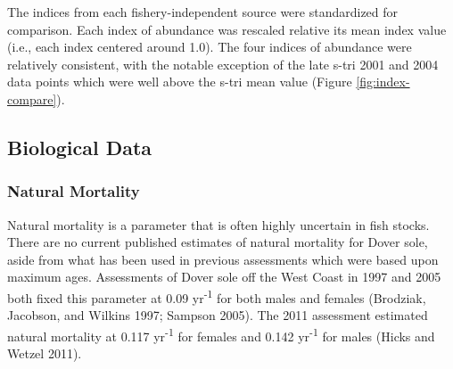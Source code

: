 \documentclass[11pt,
  english,
  a4paper,
]{article}
\begin{document}
\leavevmode\tagmcend\tagstructend


The indices from each fishery-independent source were standardized for comparison. Each index of abundance was rescaled relative its mean index value (i.e., each index centered around 1.0). The four indices of abundance were relatively consistent, with the notable exception of the late \gls{s-tri} 2001 and 2004 data points which were well above the \gls{s-tri} mean value (Figure \ref{fig:index-compare}).

\leavevmode\tagmcend\tagstructend\par


\hypertarget{biological-data}{%
\subsection{Biological Data}\label{biological-data}}

\leavevmode\tagmcend\tagstructend


\hypertarget{natural-mortality}{%
\subsubsection{Natural Mortality}\label{natural-mortality}}

\leavevmode\tagmcend\tagstructend


Natural mortality is a parameter that is often highly uncertain in fish stocks. There are no current published estimates of natural mortality for Dover sole, aside from what has been used in previous assessments which were based upon maximum ages. Assessments of Dover sole off the West Coast in 1997 and 2005 both fixed this parameter at 0.09 yr\textsuperscript{-1} for both males and females {(Brodziak, Jacobson, and Wilkins 1997; Sampson 2005)\leavevmode\tagmcend\tagstructend}. The 2011 assessment estimated natural mortality at 0.117 yr\textsuperscript{-1} for females and 0.142 yr\textsuperscript{-1} for males {(Hicks and Wetzel 2011)\leavevmode\tagmcend\tagstructend}.

\leavevmode\tagmcend\tagstructend\par
\end{document}
